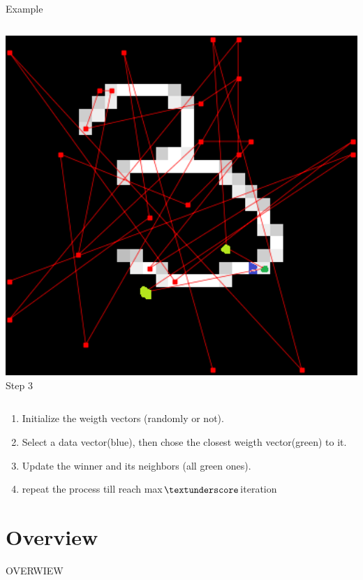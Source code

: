 \documentclass{beamer}
\begin{document}
\begin{frame}{Example}
\begin{columns}
			\begin{column}{0.33\textwidth}
      
				\centering
				\includegraphics[width=1\textwidth]{pics/algo_1_3.png}
Step 3
    			\end{column}
		\end{columns}
	
		\begin{enumerate}

			\item Initialize the weigth vectors (randomly or not).
			\item Select a data vector(blue), then chose the closest weigth vector(green) to it.
			\item Update the winner and its neighbors (all green ones).
			\item repeat the process till reach max$\textunderscore$iteration
		\end{enumerate}
	\end{frame}	
	

\section{Overview}
	
	\begin{frame}

		\begin{center}
			
			\Huge OVERWIEW
		\end{center}
	\end{frame}
\end{document}
